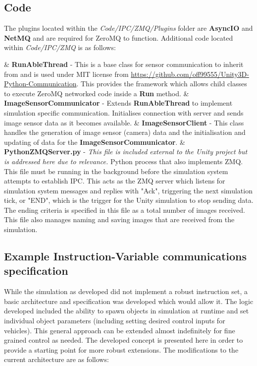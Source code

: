 \documentclass{article}
\begin{document}
\subsection{Code}

The plugins located within the \textit{Code/IPC/ZMQ/Plugins} folder are \textbf{AsyncIO} and \textbf{NetMQ} and are required for ZeroMQ to function. Additional code located within \textit{Code/IPC/ZMQ} is as follows:

\begin{easylist}[itemize]
	& \textbf{RunAbleThread} - This is a base class for sensor communication to inherit from and is used under MIT license from \url{https://github.com/off99555/Unity3D-Python-Communication}. This provides the framework which allows child classes to execute ZeroMQ networked code inside a \textbf{Run} method.
	& \textbf{ImageSensorCommunicator} - Extends \textbf{RunAbleThread} to implement simulation specific communication. Initialises connection with server and sends image sensor data as it becomes available.
	& \textbf{ImageSensorClient} - This class handles the generation of image sensor (camera) data and the initialisation and updating of data for the \textbf{ImageSensorCommunicator}.
	& \textbf{PythonZMQServer.py} - \textit{This file is included external to the Unity project but is addressed here due to relevance.} Python process that also implements ZMQ. This file must be running in the background before the simulation system attempts to establish IPC. This acts as the ZMQ server which listens for simulation system messages and replies with "Ack", triggering the next simulation tick, or "END", which is the trigger for the Unity simulation to stop sending data. The ending criteria is specified in this file as a total number of images received. This file also manages naming and saving images that are received from the simulation. 
\end{easylist}



\subsection{Example Instruction-Variable communications specification}

While the simulation as developed did not implement a robust instruction set, a basic architecture and specification was developed which would allow it. The logic developed included the ability to spawn objects in simulation at runtime and set individual object parameters (including setting desired control inputs for vehicles). This general approach can be extended almost indefinitely for fine grained control as needed. The developed concept is presented here in order to provide a starting point for more robust extensions. The modifications to the current architecture are as follows:
\end{document}
